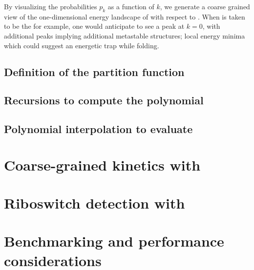 By visualizing the probabilities $p_k$ as a function of $k$, we generate a
coarse grained view of the one-dimensional energy landscape of \seq with
respect to \strSt. When \strSt is taken to be the \mfes for example, one would
anticipate to see a peak at $k=0$, with additional peaks implying additional
metastable structures; local energy minima which could suggest an energetic
trap while folding.

\subsection{Definition of the partition function
\texorpdfstring{}{}}
\label{subsec:fftbor:recursions}

\subsection{Recursions to compute the polynomial
\texorpdfstring{}{}}
\label{subsec:fftbor:polynomial}

\subsection{Polynomial interpolation to evaluate
\texorpdfstring{}{}}
\label{subsec:fftbor:fft}

\section{Coarse-grained kinetics with \fftbor}
\label{sec:fftbor:kinetics}

\section{Riboswitch detection with \fftbor}
\label{sec:fftbor:rb}

\section{Benchmarking and performance considerations}
\label{sec:fftbor:benchmarking}
